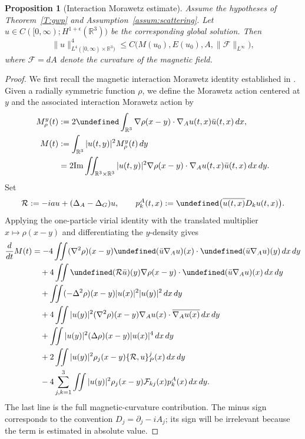 \documentclass[10pt%
]{amsart}
\numberwithin{equation}{section}
\let\Im=\undefined\DeclareMathOperator*{\Im}{Im}
\newcommand{\R}{\mathbb{R}}
\newtheorem{proposition}[theorem]{Proposition}
\theoremstyle{definition}
\newcommand{\Fcurv}{\mathcal{F}}
\begin{document}
\begin{proposition}[Interaction Morawetz estimate]\label{prop:intMorest}
	Assume the hypotheses of Theorem~\ref{T:gwp} and Assumption~\ref{assum:scattering}. Let $u\in C([0,\infty);H^{1+\epsilon}(\R^3))$ be the corresponding global solution. Then
	\begin{equation}\label{equ:intMora}
		\|u\|_{L^4([0,\infty)\times\R^3)}^4
		\le C\big(M(u_0),E(u_0),A,\|\mathcal{F}\|_{L^\infty}\big),
	\end{equation}
where $\mathcal{F}=dA$ denote the curvature of the magnetic field.
\end{proposition}

\begin{proof}	We first recall the magnetic interaction Morawetz identity established in \cite{CCL}.  Given a radially symmetric function $\rho$, we define the Morawetz action centered at $y$ and the associated interaction Morawetz action by
	\begin{align}\label{equ:moractre1}
		M_\rho^y(t)&:=2\Im \int_{\R^3}\nabla \rho(x-y)\cdot \nabla_A
		u(t,x)\bar{u}(t,x)\,dx,\\
		\label{equ:moractre12}
		M(t)&:=\int_{\R^3}|u(t,y)|^2 M_\rho^y(t)\,dy\\\nonumber
		&=2{\rm
			Im}\iint_{\R^3\times\R^3}|u(t,y)|^2\nabla \rho(x-y)\cdot \nabla_A
		u(t,x)\bar{u}(t,x)\,dx\,dy.
	\end{align}
	Set
	\[
	\mathcal R:=-iau+(\Delta_A-\Delta_G)u,
	\qquad
	p_k^A(t,x):=\Im\big(\overline{u(t,x)}D_ku(t,x)\big).
	\]
	Applying the one-particle virial identity with the translated multiplier $x\mapsto\rho(x-y)$ and differentiating the $y$-density gives
	\begin{align}
		\frac{d}{dt}M(t)
		&=-4\iint(\nabla^2\rho)(x-y)\Im(\bar u\nabla_Au)(x)\cdot\Im(\bar u\nabla_Au)(y)\,dx\,dy\label{equ:main1}\\
		&\quad+4\iint\Im(\mathcal R\bar u)(y)\nabla\rho(x-y)\cdot\Im(\bar u\nabla_Au)(x)\,dx\,dy\label{equ:main2}\\
		&\quad+\iint(-\Delta^2\rho)(x-y)|u(x)|^2|u(y)|^2\,dx\,dy\label{equ:main3}\\
		&\quad+4\iint|u(y)|^2(\nabla^2\rho)(x-y)\nabla_Au(x)\cdot\overline{\nabla_Au(x)}\,dx\,dy\label{equ:main4}\\
		&\quad+\iint|u(y)|^2(\Delta\rho)(x-y)|u(x)|^4\,dx\,dy\label{equ:main5}\\
		&\quad+2\iint|u(y)|^2\rho_j(x-y)\{\mathcal R,u\}_P^j(x)\,dx\,dy\label{equ:errtermMor}\\
		&\quad-4\sum_{j,k=1}^3\iint|u(y)|^2\rho_j(x-y)\Fcurv_{kj}(x)p_k^A(x)\,dx\,dy.\label{equ:main5-new}
	\end{align}
	The last line is the full magnetic-curvature contribution. The minus sign corresponds to the convention $D_j=\partial_j-iA_j$; its sign will be irrelevant because the term is estimated in absolute value.


\end{proof}
\end{document}
